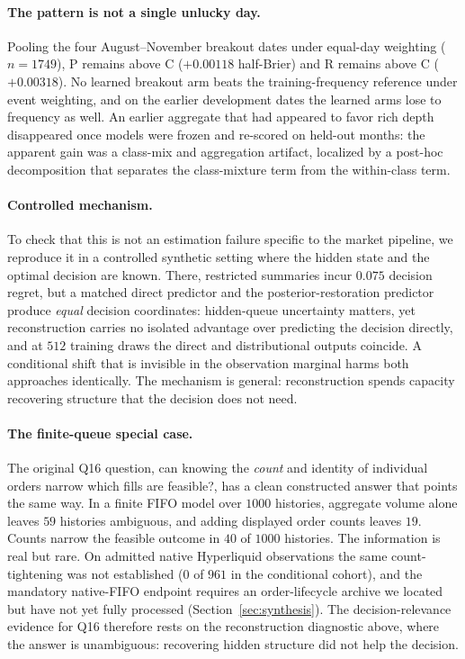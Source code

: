 \paragraph{The pattern is not a single unlucky day.} Pooling the four August--November
breakout dates under equal-day weighting ($n=1749$), P remains above C ($+0.00118$
half-Brier) and R remains above C ($+0.00318$). No learned breakout arm beats the
training-frequency reference under event weighting, and on the earlier development dates
the learned arms lose to frequency as well. An earlier aggregate that had appeared to
favor rich depth disappeared once models were frozen and re-scored on held-out months:
the apparent gain was a class-mix and aggregation artifact, localized by a post-hoc
decomposition that separates the class-mixture term from the within-class term.

\paragraph{Controlled mechanism.} To check that this is not an estimation failure specific
to the market pipeline, we reproduce it in a controlled synthetic setting where the hidden
state and the optimal decision are known. There, restricted summaries incur $0.075$
decision regret, but a matched direct predictor and the posterior-restoration predictor
produce \emph{equal} decision coordinates: hidden-queue uncertainty matters, yet
reconstruction carries no isolated advantage over predicting the decision directly, and at
$512$ training draws the direct and distributional outputs coincide. A conditional shift
that is invisible in the observation marginal harms both approaches identically. The
mechanism is general: reconstruction spends capacity recovering structure that the
decision does not need.

\paragraph{The finite-queue special case.} The original Q16 question, can knowing the
\emph{count} and identity of individual orders narrow which fills are feasible?, has a
clean constructed answer that points the same way. In a finite FIFO model over $1000$
histories, aggregate volume alone leaves $59$ histories ambiguous, and adding displayed
order counts leaves $19$. Counts narrow the feasible outcome in $40$ of $1000$ histories.
The information is real but rare. On admitted native Hyperliquid observations the same
count-tightening was not established ($0$ of $961$ in the conditional cohort), and the
mandatory native-FIFO endpoint requires an order-lifecycle archive we located but have not
yet fully processed (Section~\ref{sec:synthesis}). The decision-relevance evidence for Q16
therefore rests on the reconstruction diagnostic above, where the answer is unambiguous:
recovering hidden structure did not help the decision.
